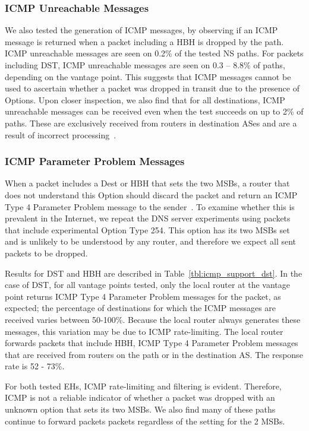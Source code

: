 \documentclass[conference]{IEEEtran}
\begin{document}
\subsubsection{ICMP Unreachable Messages}

We also tested the generation of
ICMP messages, by observing if an ICMP message is returned when a packet including a HBH is dropped by the path. ICMP unreachable messages are seen on 0.2\% of the tested NS paths. For packets including DST, ICMP unreachable messages are seen on 0.3 – 8.8\% of paths, depending on the vantage point.
This suggests that ICMP messages cannot be used to ascertain whether a packet was dropped in transit due to the presence of Options.
Upon closer inspection, we also find that for all destinations, ICMP unreachable messages can be received even when the test succeeds on up to 2\% of paths. These are exclusively received from routers in destination ASes and are a result of incorrect processing~\cite{RFC8200}.

\subsubsection{ICMP Parameter Problem Messages}

When a packet includes a Dest or HBH that sets the two MSBs, a router that does not understand this Option should discard the packet and return an ICMP Type 4 Parameter Problem message to the sender~\cite{RFC8200}. To examine whether this is prevalent in the Internet, we repeat the DNS server experiments using packets that include experimental Option Type 254. This option has its two MSBs set and is unlikely to be understood by any router, and therefore we expect all sent packets to be dropped.

Results for DST and HBH are described in Table~\ref{tbl:icmp_support_dst}.
In the case of DST, for all vantage points tested, only the local router at the vantage point returns ICMP Type 4 Parameter Problem messages for the packet, as expected; the percentage of destinations for which the ICMP messages are received varies between 50-100\%. Because the local router always generates these messages, this variation may be due to ICMP rate-limiting. 
The local router forwards packets that include HBH,  ICMP Type 4 Parameter Problem messages that are received from routers on the path or in the destination AS. The response rate is 52 - 73\%. 

For both tested EHs, ICMP rate-limiting and filtering is evident. Therefore, ICMP is not a reliable indicator of whether a packet was dropped with an unknown option that sets its two MSBs. We also find many of these paths continue to forward packets packets regardless of the setting for the 2 MSBs.
\end{document}
